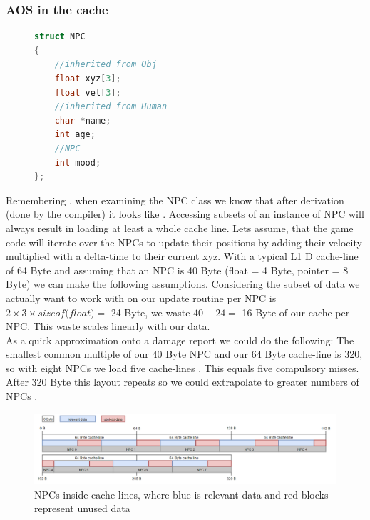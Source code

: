 \subsubsection{AOS in the cache}
\begin{figure}
\begin{lstlisting}[language=C++,numbers=none,name={NPC pod after derivation is done},label={post_deriv_npc}]
struct NPC 
{
	//inherited from Obj 
	float xyz[3];
	float vel[3];
	//inherited from Human
	char *name;
	int age;
	//NPC
	int mood;
};
\end{lstlisting}
\end{figure}
Remembering , when examining the NPC class we know that after derivation (done by the compiler) it looks like . Accessing subsets of an instance of NPC will always result in loading at least a whole cache line. Lets assume, that the game code will iterate over the NPCs to update their positions by adding their velocity multiplied with a delta-time to their current xyz. With a typical L1 D cache-line of 64 Byte and assuming that an NPC is 40 Byte (float = 4 Byte, pointer = 8 Byte) we can make the following assumptions. Considering the subset of data we actually want to work with on our update routine per NPC is $2\times 3\times \textit{sizeof(float)} = $ 24 Byte, we waste $40 - 24 =$ 16 Byte of our cache per NPC. This waste scales linearly with our data.\\
As a quick approximation onto a damage report we could do the following:
The smallest common multiple of our 40 Byte NPC and our 64 Byte cache-line is 320, so with eight NPCs we load five cache-lines . This equals five compulsory misses. After 320 Byte this layout repeats so we could extrapolate to greater numbers of NPCs . 
\begin{figure}[!htbp]
	\centering
	\includegraphics[width=1.0\linewidth, height=0.3\linewidth]{PICs/CacheUtilizationNPC}
	\caption{NPCs inside cache-lines, where blue is relevant data and red blocks represent unused data}\label{cache_utilization_npc}
\end{figure}
